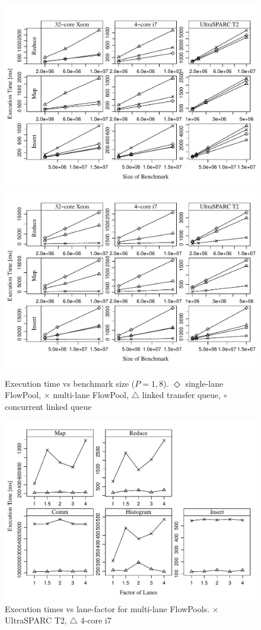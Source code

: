 \documentclass[runningheads,a4paper]{llncs}
\begin{document}
\begin{figure}
\includegraphics[width=\textwidth]{../benchmarks/graphs/size-scaling-par1}
\includegraphics[width=\textwidth]{../benchmarks/graphs/size-scaling-par8}
\caption{Execution time vs benchmark size ($P = 1, 8$).
  $\Diamond$ single-lane FlowPool,
  $\times$ multi-lane FlowPool,
  $\triangle$ linked transfer queue,
  $\circ$ concurrent linked queue} \label{fig:eval-size-scaling}
\end{figure}

\begin{figure}
\includegraphics[width=\textwidth]{../benchmarks/graphs/lanef-scaling}
\caption{Execution times vs lane-factor for multi-lane
  FlowPools. $\times$ UltraSPARC T2, $\triangle$ 4-core i7}
\label{fig:eval-lane-factor}
\end{figure}
\end{document}
